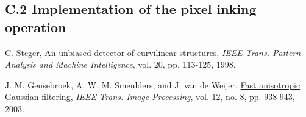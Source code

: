 \documentclass{article}
\begin{document}
\subsection*{C.2 Implementation of the pixel inking operation}



\pagebreak
\begin{thebibliography}{9}
\fontsize{10pt}{12pt}\selectfont
\raggedright

        C. Steger, An unbiased detector of curvilinear structures, 
        \emph{IEEE Trans. Pattern Analysis and Machine Intelligence},
        vol. 20, pp. 113-125, 1998.

        J. M. Geusebroek, A. W. M. Smeulders, and J. van de Weijer, 
        \ul{Fast anisotropic Gaussian filtering},
        \emph{IEEE Trans. Image Processing}, vol. 12, no. 8, pp. 938-943, 2003.


\end{thebibliography}


\end{document}

